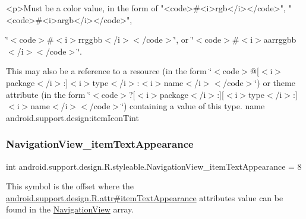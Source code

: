 \begin{DoxyVerb}      <p>Must be a color value, in the form of "<code>#<i>rgb</i></code>", "<code>#<i>argb</i></code>",
\end{DoxyVerb}
 \char`\"{}$<$code$>$\#$<$i$>$rrggbb$<$/i$>$$<$/code$>$\char`\"{}, or \char`\"{}$<$code$>$\#$<$i$>$aarrggbb$<$/i$>$$<$/code$>$\char`\"{}. 

This may also be a reference to a resource (in the form \char`\"{}$<$code$>$@\mbox{[}$<$i$>$package$<$/i$>$\+:\mbox{]}$<$i$>$type$<$/i$>$\+:$<$i$>$name$<$/i$>$$<$/code$>$\char`\"{}) or theme attribute (in the form \char`\"{}$<$code$>$?\mbox{[}$<$i$>$package$<$/i$>$\+:\mbox{]}\mbox{[}$<$i$>$type$<$/i$>$\+:\mbox{]}$<$i$>$name$<$/i$>$$<$/code$>$\char`\"{}) containing a value of this type.  name android.\+support.\+design\+:item\+Icon\+Tint \mbox{\label{classandroid_1_1support_1_1design_1_1R_1_1styleable_a2244c9e51c554738441dc51c38821ef5}} 
\subsubsection{\texorpdfstring{Navigation\+View\+\_\+item\+Text\+Appearance}{NavigationView\_itemTextAppearance}}
{\footnotesize\ttfamily int android.\+support.\+design.\+R.\+styleable.\+Navigation\+View\+\_\+item\+Text\+Appearance = 8\hspace{0.3cm}{\ttfamily [static]}}

This symbol is the offset where the \hyperlink{classandroid_1_1support_1_1design_1_1R_1_1attr_a6cb807da22881ce46c383a4b700f7f0e}{android.\+support.\+design.\+R.\+attr\#item\+Text\+Appearance} attribute\textquotesingle{}s value can be found in the \hyperlink{classandroid_1_1support_1_1design_1_1R_1_1styleable_a277c199f371e8804c26e2cd6dbf88999}{Navigation\+View} array.

